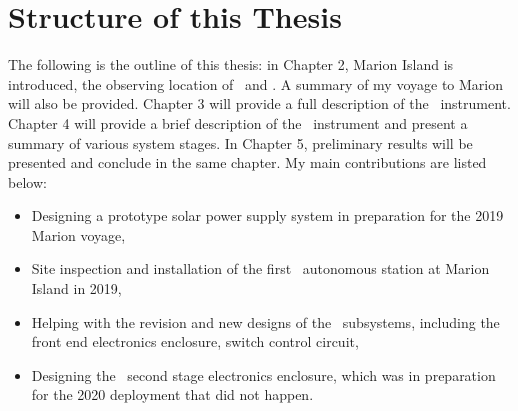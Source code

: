 \section{Structure of this Thesis}


The following is the outline of this thesis: in Chapter 2, 
Marion Island is introduced, the observing location of \prizm\ and \albatros. A summary of my voyage to Marion will also be provided. Chapter 3 will provide a full description of the \albatros\ instrument. Chapter 4 will provide a brief description of the \prizm\ instrument and present a summary of various system stages. In Chapter 5, preliminary results will be presented and conclude in the same chapter. My main contributions are listed below:
\begin{itemize}
	\item Designing a prototype solar power supply system in preparation for the 2019 Marion voyage, 
	\item Site inspection and installation of the first \albatros\ autonomous station at Marion Island in 2019,
	\item Helping with the revision and new designs of the \prizm\ subsystems, including the front end electronics enclosure, switch control circuit, 
	\item Designing the \prizm\ second stage electronics enclosure, which was in preparation for the 2020 deployment that did not happen.
\end{itemize}
